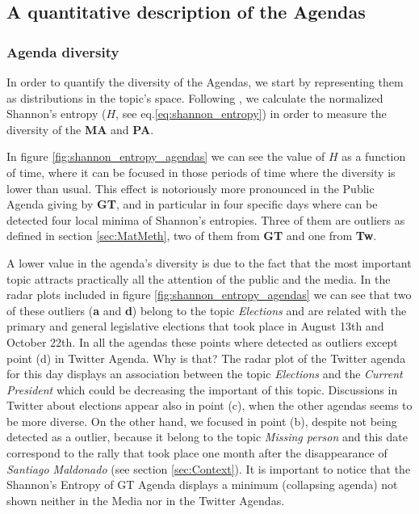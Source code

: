 \documentclass{bmcart}
\begin{document}
\subsection*{A quantitative description of the Agendas}

\subsubsection*{Agenda diversity}

\par In order to quantify the diversity of the Agendas, we start by representing them as distributions in the topic's space. 
Following \cite{boydstun2014importance}, we calculate the normalized Shannon's entropy ($H$, see eq.\ref{eq:shannon_entropy}) in order to measure the diversity of the \textbf{MA} and \textbf{PA}.
\par In figure \ref{fig:shannon_entropy_agendas} we can see the value of $H$ as a function of time, where it can be focused in those periods of time where the diversity is lower than usual. This effect is notoriously more pronounced in the Public Agenda giving by \textbf{GT}, and in particular in four specific days  where can be detected four local minima of Shannon's entropies. Three of them are outliers as defined in section \ref{sec:MatMeth}, two of them from \textbf{GT} and one from \textbf{Tw}. 
\par A lower value in the agenda's diversity is due to the fact that the most important topic attracts practically all the attention of the public and the media.
In the radar plots included in figure \ref{fig:shannon_entropy_agendas} we can see that two of these outliers (\textbf{a} and \textbf{d}) belong to the topic \emph{Elections} and are related with the primary and general legislative elections that took place in August 13th and October 22th. 
In all the agendas these points where detected as outliers except point (d) in Twitter Agenda. Why is that? The radar plot of the Twitter agenda for this day displays an association between the topic \emph{Elections} and the \emph{Current President} which could be decreasing the important of this topic.
Discussions in Twitter about elections appear also in point (c), when the other agendas seems to be more diverse. 
On the other hand, we focused in point (b), despite not being detected as a outlier, because it belong to the topic \emph{Missing person} and this date correspond to the rally that took place one month after the disappearance of \emph{Santiago Maldonado} (see section \ref{sec:Context}). It is important to notice that the Shannon's Entropy of GT Agenda displays a minimum (collapsing agenda) not shown neither in the Media nor in the Twitter Agendas.
\end{document}
